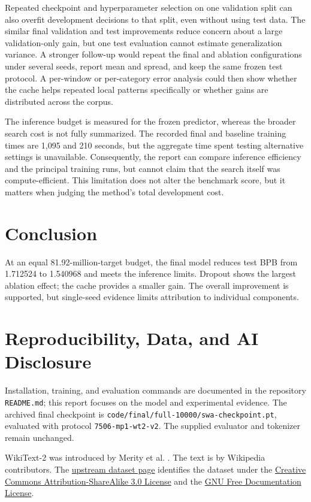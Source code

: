 \documentclass[11pt]{article}
\begin{document}
Repeated checkpoint and hyperparameter selection on one validation split can also overfit development decisions to that split, even without using test data. The similar final validation and test improvements reduce concern about a large validation-only gain, but one test evaluation cannot estimate generalization variance. A stronger follow-up would repeat the final and ablation configurations under several seeds, report mean and spread, and keep the same frozen test protocol. A per-window or per-category error analysis could then show whether the cache helps repeated local patterns specifically or whether gains are distributed across the corpus.

The inference budget is measured for the frozen predictor, whereas the broader search cost is not fully summarized. The recorded final and baseline training times are 1,095 and 210 seconds, but the aggregate time spent testing alternative settings is unavailable. Consequently, the report can compare inference efficiency and the principal training runs, but cannot claim that the search itself was compute-efficient. This limitation does not alter the benchmark score, but it matters when judging the method's total development cost.

\section{Conclusion}
At an equal 81.92-million-target budget, the final model reduces test BPB from 1.712524 to 1.540968 and meets the inference limits. Dropout shows the largest ablation effect; the cache provides a smaller gain. The overall improvement is supported, but single-seed evidence limits attribution to individual components.

\section{Reproducibility, Data, and AI Disclosure}
Installation, training, and evaluation commands are documented in the repository \texttt{README.md}; this report focuses on the model and experimental evidence. The archived final checkpoint is \texttt{code/final/full-10000/swa-checkpoint.pt}, evaluated with protocol \texttt{7506-mp1-wt2-v2}. The supplied evaluator and tokenizer remain unchanged.

WikiText-2 was introduced by Merity et al. \cite{merity2016pointer}.
The text is by Wikipedia contributors. The \href{https://huggingface.co/datasets/Salesforce/wikitext}{upstream dataset page} identifies the dataset under the \href{https://creativecommons.org/licenses/by-sa/3.0/}{Creative Commons Attribution-ShareAlike 3.0 License} and the \href{https://www.gnu.org/licenses/fdl-1.3.html}{GNU Free Documentation License}.
\end{document}
